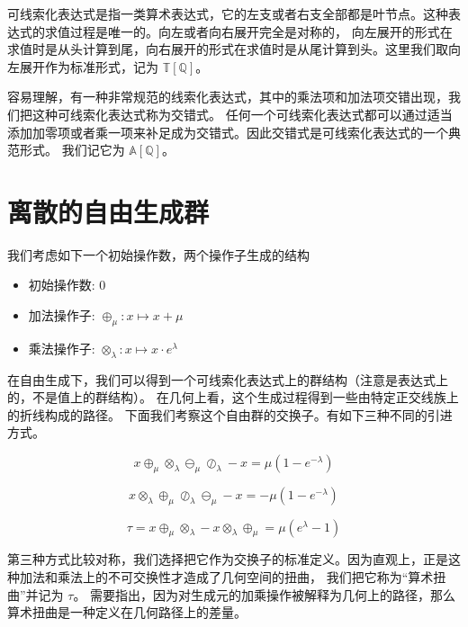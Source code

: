 \documentclass[a4paper,12pt]{book}
\numberwithin{problem}{section}
\numberwithin{definition}{section}
\numberwithin{lemma}{section}
\numberwithin{proposition}{section}
\numberwithin{theorem}{section}
\numberwithin{grammar}{section}
\numberwithin{program}{section}
\numberwithin{convention}{section}
\numberwithin{corollary}{section}
\begin{document}
可线索化表达式是指一类算术表达式，它的左支或者右支全部都是叶节点。这种表达式的求值过程是唯一的。向左或者向右展开完全是对称的，
向左展开的形式在求值时是从头计算到尾，向右展开的形式在求值时是从尾计算到头。这里我们取向左展开作为标准形式，记为 $\mathbb{T} \left [\mathbb{Q} \right ]$。

容易理解，有一种非常规范的线索化表达式，其中的乘法项和加法项交错出现，我们把这种可线索化表达式称为交错式。
任何一个可线索化表达式都可以通过适当添加加零项或者乘一项来补足成为交错式。因此交错式是可线索化表达式的一个典范形式。
我们记它为 $\mathbb{A} \left [\mathbb{Q} \right ]$。

\section{离散的自由生成群}

我们考虑如下一个初始操作数，两个操作子生成的结构
\begin{itemize}
\item 初始操作数: $0$
\item 加法操作子: $\oplus_\mu: x \mapsto x + \mu$
\item 乘法操作子: $\otimes_\lambda: x \mapsto x \cdot e^\lambda$
\end{itemize}

在自由生成下，我们可以得到一个可线索化表达式上的群结构（注意是表达式上的，不是值上的群结构）。 在几何上看，这个生成过程得到一些由特定正交线族上的折线构成的路径。
下面我们考察这个自由群的交换子。有如下三种不同的引进方式。

\begin{equation}
x \oplus_\mu \otimes_\lambda \ominus_\mu \oslash_\lambda - x = \mu(1 - e^{-\lambda})\label{eq:commutator1}
\end{equation}

\begin{equation}
x \otimes_\lambda \oplus_\mu \oslash_\lambda \ominus_\mu - x = - \mu(1 - e^{-\lambda})\label{eq:commutator2}
\end{equation}

\begin{equation}
\tau = x \oplus_\mu \otimes_\lambda - x \otimes_\lambda \oplus_\mu = \mu(e^\lambda - 1)\label{eq:torsion}
\end{equation}

第三种方式比较对称，我们选择把它作为交换子的标准定义。因为直观上，正是这种加法和乘法上的不可交换性才造成了几何空间的扭曲，
我们把它称为“算术扭曲”并记为 $\tau$。 需要指出，因为对生成元的加乘操作被解释为几何上的路径，那么算术扭曲是一种定义在几何路径上的差量。
\end{document}
